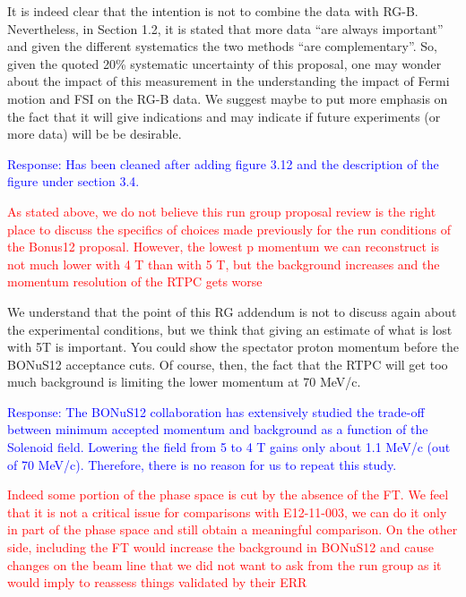 \begin{itemize}
  It is indeed clear that the intention is not to combine the data with RG-B.  
       Nevertheless, in Section 1.2, it is stated that more data ``are always 
       important'' and given the different systematics the two methods ``are 
       complementary''. So, given the quoted 20\% systematic uncertainty of 
       this proposal, one may wonder about the impact of this measurement in 
       the understanding the impact of Fermi motion and FSI on the RG-B data.
  We suggest maybe to put more emphasis on the fact that it will give 
       indications and may indicate if future experiments (or more data) will 
       be be desirable.
  
  \textcolor{blue}{Response: Has been cleaned after adding figure 3.12 and the 
       description of the figure under section 3.4. }
  
       
 \textcolor{red}{
 \item As stated above, we do not believe this run group proposal review is the 
    right place to discuss the specifics of choices made previously for the run 
       conditions of the Bonus12 proposal. However, the lowest p momentum we 
       can reconstruct is not much lower with 4 T than with 5 T, but the 
       background increases and the momentum resolution of the RTPC gets worse}
\newline

We understand that the point of this RG addendum is not to discuss again about 
       the experimental conditions, but we think that giving an estimate of 
       what is lost with 5T is important. You could show the spectator proton 
       momentum before the BONuS12 acceptance cuts. Of course, then, the fact 
       that the RTPC will get too much background is limiting the lower 
       momentum at 70 MeV/c.

  
       \textcolor{blue}{Response: The BONuS12 collaboration has extensively 
       studied the trade-off between minimum accepted momentum and background 
       as a function of the Solenoid field. Lowering the field from 5 to 4 T 
       gains only about 1.1 MeV/c (out of 70 MeV/c). Therefore, there is no 
       reason for us to repeat this study. }

\textcolor{red}{
\item Indeed some portion of the phase space is cut by the absence of the FT. 
   We feel that it is not a critical issue
for comparisons with E12-11-003, we can do it only in part of the phase space and still
obtain a meaningful comparison. On the other side, including the FT would increase
the background in BONuS12 and cause changes on the beam line that we did not want
to ask from the run group as it would imply to reassess things validated by their ERR
}
 \newline


\end{itemize}
